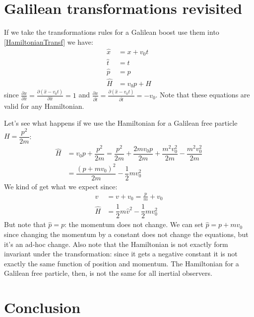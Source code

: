 \documentclass[aps,pra,10pt,floatfix,nofootinbib]{revtex4-1}
\theoremstyle{definition}
\begin{document}
\section{Galilean transformations revisited}
If we take the transformations rules for a Galilean boost use them into \eqref{HamiltonianTransf} we have:
\begin{equation}
\begin{aligned}
\hat{x} &= x + v_0 t \\
\hat{t} &= t \\
\hat{p} &= p \\
\hat{H} &= v_0 p + H
\end{aligned}
\label{galTransf}
\end{equation}
since $\frac{\partial x}{\partial \hat{x}} = \frac{\partial (\hat{x} - v_0 t)}{\partial \hat{x}} = 1$ and $\frac{\partial x}{\partial \hat{t}} = \frac{\partial (\hat{x} - v_0 t)}{\partial \hat{t}} = - v_0$. Note that these equations are valid for any Hamiltonian.

Let's see what happens if we use the Hamiltonian for a Galilean free particle $H=\dfrac{p^2}{2m}$:
\begin{equation}
\begin{aligned}
\hat{H} &= v_0 p + \dfrac{p^2}{2m} = \dfrac{p^2}{2m} + \dfrac{2mv_0 p}{2m} + \dfrac{m^2 v_0^2}{2m} - \dfrac{m^2 v_0^2}{2m} \\
&= \dfrac{(p+mv_0)^2}{2m} - \dfrac{1}{2} m v_0^2
\end{aligned}
\label{galTransf}
\end{equation}
We kind of get what we expect since:
\begin{equation}
\begin{aligned}
\hat{v} &= v + v_0 =  \frac{p}{m} + v_0 \\
\hat{H} &= \dfrac{1}{2} m \hat{v}^2 - \dfrac{1}{2} m v_0^2
\end{aligned}
\label{galTransf}
\end{equation}
But note that $\hat{p} = p$: the momentum does not change. We can set $\hat{p} = p + m v_0$ since changing the momentum by a constant does not change the equations, but it's an ad-hoc change. Also note that the Hamiltonian is not exactly form invariant under the transformation: since it gets a negative constant it is not exactly the same function of position and momentum. The Hamiltonian for a Galilean free particle, then, is not the same for all inertial observers.

\section{Conclusion}
\end{document}
